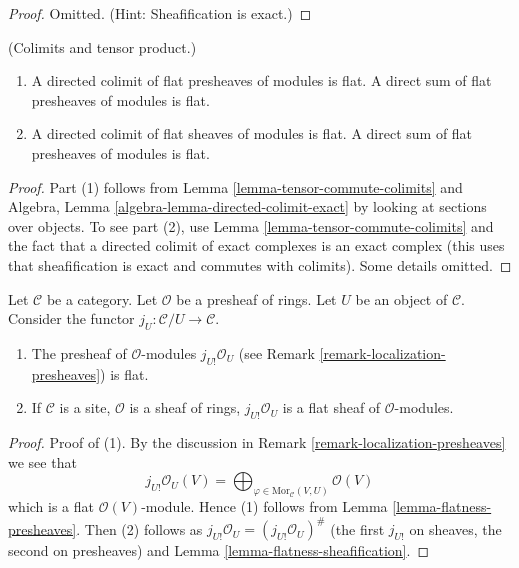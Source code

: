 \begin{proof}
Omitted. (Hint: Sheafification is exact.)
\end{proof}

\begin{lemma}
\label{lemma-colimits-flat}
(Colimits and tensor product.)
\begin{enumerate}
\item A directed colimit of flat presheaves of modules
is flat. A direct sum of flat presheaves of modules is flat.
\item A directed colimit of flat sheaves of modules is flat.
A direct sum of flat presheaves of modules is flat.
\end{enumerate}
\end{lemma}

\begin{proof}
Part (1) follows from Lemma \ref{lemma-tensor-commute-colimits} and
Algebra, Lemma \ref{algebra-lemma-directed-colimit-exact}
by looking at sections over objects.
To see part (2), use Lemma \ref{lemma-tensor-commute-colimits} and
the fact that a directed colimit of exact 
complexes is an exact complex (this uses that sheafification is exact
and commutes with colimits). Some details omitted.
\end{proof}

\begin{lemma}
\label{lemma-j-shriek-flat}
Let $\mathcal{C}$ be a category.
Let $\mathcal{O}$ be a presheaf of rings.
Let $U$ be an object of $\mathcal{C}$.
Consider the functor $j_U : \mathcal{C}/U \to \mathcal{C}$.
\begin{enumerate}
\item The presheaf of $\mathcal{O}$-modules
$j_{U!}\mathcal{O}_U$ (see Remark \ref{remark-localization-presheaves})
is flat.
\item If $\mathcal{C}$ is a site, $\mathcal{O}$ is a sheaf of rings,
$j_{U!}\mathcal{O}_U$ is a flat sheaf of $\mathcal{O}$-modules.
\end{enumerate}
\end{lemma}

\begin{proof}
Proof of (1). By the discussion in
Remark \ref{remark-localization-presheaves} we see that
$$
j_{U!}\mathcal{O}_U(V)
=
\bigoplus\nolimits_{\varphi \in \text{Mor}_{\mathcal{C}}(V, U)}
\mathcal{O}(V)
$$
which is a flat $\mathcal{O}(V)$-module. Hence (1) follows from
Lemma \ref{lemma-flatness-presheaves}.
Then (2) follows as $j_{U!}\mathcal{O}_U = (j_{U!}\mathcal{O}_U)^\#$
(the first $j_{U!}$ on sheaves, the second on presheaves)
and Lemma \ref{lemma-flatness-sheafification}.
\end{proof}

